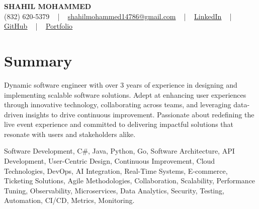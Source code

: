 \documentclass[letterpaper,10pt]{article}
\begin{document}
\begin{center}
    {\fontsize{14pt}{12pt}\selectfont \textbf{\MakeUppercase{Shahil Mohammed}}}\\ \vspace{2pt}
    \fontsize{10pt}{12pt}\selectfont (832) 620-5379 ~ | ~ \href{mailto:shahilmohammed14786@gmail.com}{shahilmohammed14786@gmail.com} ~ | ~  
    \href{https://www.linkedin.com/in/shahil-mohammed-9652931a1/}{\color{blue}\underline{LinkedIn}}  ~ | ~ 
    \href{https://github.com/freakbeast14}{\color{blue}\underline{GitHub}} ~ | ~ 
    \href{https://shahil-mohammed.netlify.app/}{\color{blue}\underline{Portfolio}}
    \vspace{-8pt}
\end{center}

\section{Summary}
\vspace{-2pt}\fontsize{8pt}{9pt}\selectfont
Dynamic software engineer with over 3 years of experience in designing and implementing scalable software solutions. Adept at enhancing user experiences through innovative technology, collaborating across teams, and leveraging data-driven insights to drive continuous improvement. Passionate about redefining the live event experience and committed to delivering impactful solutions that resonate with users and stakeholders alike.
 \vspace{-5pt}
 
{\fontsize{1pt}{1pt}\selectfont\color{white}
Software Development, C#, Java, Python, Go, Software Architecture, API Development, User-Centric Design, Continuous Improvement, Cloud Technologies, DevOps, AI Integration, Real-Time Systems, E-commerce, Ticketing Solutions, Agile Methodologies, Collaboration, Scalability, Performance Tuning, Observability, Microservices, Data Analytics, Security, Testing, Automation, CI/CD, Metrics, Monitoring.
}
\vspace{-8pt}

\vspace{-2pt}
\end{document}
